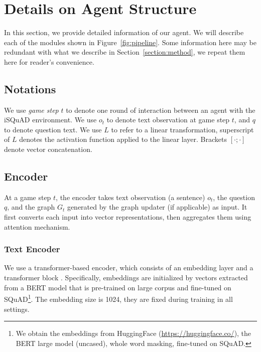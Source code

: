 \documentclass[11pt]{article}
\newcommand{\isquad}{iSQuAD\xspace}
\begin{document}
\section{Details on Agent Structure}
\label{appendix:agent_structure}
In this section, we provide detailed information of our agent.
We will describe each of the modules shown in Figure~\ref{fig:pipeline}.
Some information here may be redundant with what we describe in Section~\ref{section:method}, we repeat them here for reader's convenience.


\subsection*{Notations}

We use \textit{game step} $t$ to denote one round of interaction between an agent with the \isquad environment.
We use $o_t$ to denote text observation at game step $t$, and $q$ to denote question text.
We use $L$ to refer to a linear transformation, superscript of $L$ denotes the activation function applied to the linear layer.
Brackets $[\cdot;\cdot]$ denote vector concatenation.


\subsection{Encoder}
\label{appendix:encoder}
At a game step $t$, the encoder takes text observation (a sentence) $o_t$, the question $q$, and the graph $G_t$ generated by the graph updater (if applicable) as input.
It first converts each input into vector representations, then aggregates them using attention mechanism.

\subsubsection{Text Encoder}
We use a transformer-based encoder, which consists of an embedding layer and a transformer block \citep{vaswani17transformer}.
Specifically, embeddings are initialized by vectors extracted from a BERT model \citep{devlin2018bert} that is pre-trained on large corpus and fine-tuned on SQuAD\footnote{We obtain the embeddings from HuggingFace (\url{https://huggingface.co/}), the BERT large model (uncased), whole word masking, fine-tuned on SQuAD.}.
The embedding size is 1024, they are fixed during training in all settings.
\end{document}
